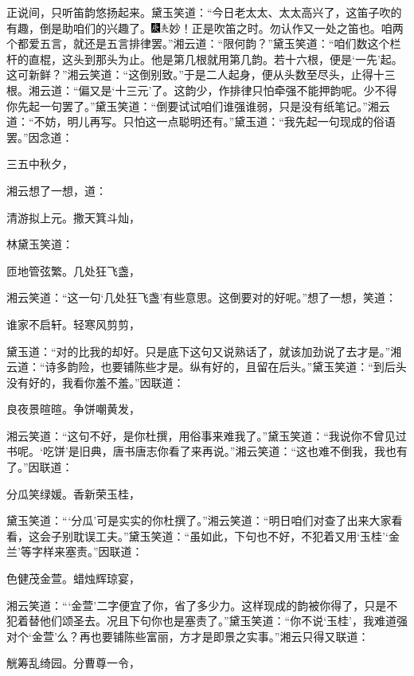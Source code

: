 正说间，只听笛韵悠扬起来。黛玉笑道：“今日老太太、太太高兴了，这笛子吹的有趣，倒是助咱们的兴趣了。{\includegraphics[width=3mm]{../Images/00004}\includegraphics[width=3mm]{../Images/00012}\footnotesize \kaishu 妙！正是吹笛之时。勿认作又一处之笛也。}咱两个都爱五言，就还是五言排律罢。”湘云道：“限何韵？”黛玉笑道：“咱们数这个栏杆的直棍，这头到那头为止。他是第几根就用第几韵。若十六根，便是‘一先’起。这可新鲜？”湘云笑道：“这倒别致。”于是二人起身，便从头数至尽头，止得十三根。湘云道：“偏又是‘十三元’了。这韵少，作排律只怕牵强不能押韵呢。少不得你先起一句罢了。”黛玉笑道：“倒要试试咱们谁强谁弱，只是没有纸笔记。”湘云道：“不妨，明儿再写。只怕这一点聪明还有。”黛玉道：“我先起一句现成的俗语罢。”因念道：

三五中秋夕，

湘云想了一想，道：

清游拟上元。撒天箕斗灿，

林黛玉笑道：

匝地管弦繁。几处狂飞盏，

湘云笑道：“这一句‘几处狂飞盏’有些意思。这倒要对的好呢。”想了一想，笑道：

谁家不启轩。轻寒风剪剪，

黛玉道：“对的比我的却好。只是底下这句又说熟话了，就该加劲说了去才是。”湘云道：“诗多韵险，也要铺陈些才是。纵有好的，且留在后头。”黛玉笑道：“到后头没有好的，我看你羞不羞。”因联道：

良夜景暄暄。争饼嘲黄发，

湘云笑道：“这句不好，是你杜撰，用俗事来难我了。”黛玉笑道：“我说你不曾见过书呢。‘吃饼’是旧典，唐书唐志你看了来再说。”湘云笑道：“这也难不倒我，我也有了。”因联道：

分瓜笑绿媛。香新荣玉桂，

黛玉笑道：“‘分瓜’可是实实的你杜撰了。”湘云笑道：“明日咱们对查了出来大家看看，这会子别耽误工夫。”黛玉笑道：“虽如此，下句也不好，不犯着又用‘玉桂’‘金兰’等字样来塞责。”因联道：

色健茂金萱。蜡烛辉琼宴，

湘云笑道：“‘金萱’二字便宜了你，省了多少力。这样现成的韵被你得了，只是不犯着替他们颂圣去。况且下句你也是塞责了。”黛玉笑道：“你不说‘玉桂’，我难道强对个‘金萱’么？再也要铺陈些富丽，方才是即景之实事。”湘云只得又联道：

觥筹乱绮园。分曹尊一令，

